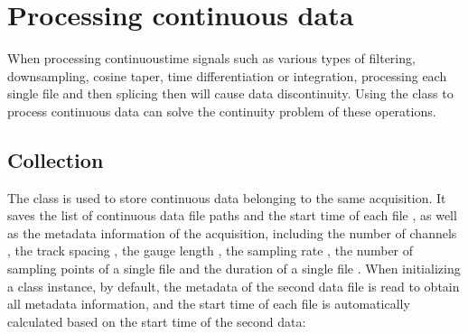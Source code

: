\documentclass[letterpaper,10pt,english]{sphinxmanual}
\begin{document}
\sphinxstepscope


\section{Processing continuous data}
\label{\detokenize{Handling Continuous Data:processing-continuous-data}}\label{\detokenize{Handling Continuous Data::doc}}
\sphinxAtStartPar
When processing continuous\sphinxhyphen{}time signals such as various types of filtering, downsampling, cosine taper, time differentiation or integration, processing each single file and then splicing then will cause data discontinuity. Using the  class to process continuous data can solve the continuity problem of these operations.


\subsection{Collection}
\label{\detokenize{Handling Continuous Data:collection}}
\sphinxAtStartPar
The  class is used to store continuous data belonging to the same acquisition. It saves the list of continuous data file paths  and the start time of each file , as well as the metadata information of the acquisition, including the number of channels , the track spacing , the gauge length , the sampling rate , the number of sampling points of a single file  and the duration of a single file . When initializing a class instance, by default, the metadata of the second data file is read to obtain all metadata information, and the start time of each file  is automatically calculated based on the start time  of the second data:
\end{document}
